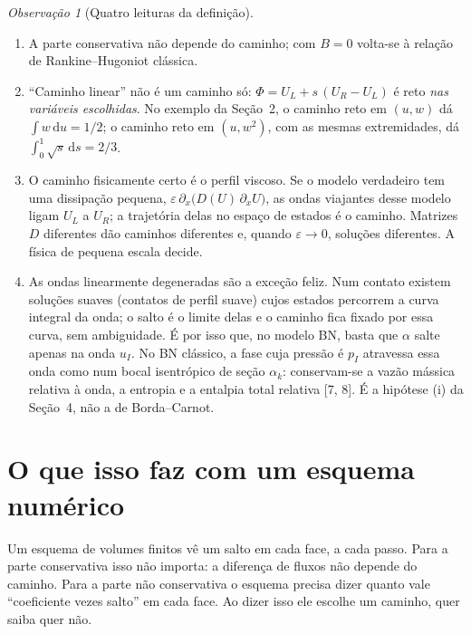 \documentclass[11pt,a4paper]{article}
\theoremstyle{definition}
\theoremstyle{remark}
\newtheorem{observacao}[definicao]{Observação}
\newcommand{\dd}{\mathrm{d}}
\begin{document}
\begin{observacao}[Quatro leituras da definição]\label{obs:leituras}\leavevmode
\begin{enumerate}
\item A parte conservativa não depende do caminho; com $B=0$ volta-se à relação de Rankine--Hugoniot clássica.
\item ``Caminho linear'' não é um caminho só: $\Phi=U_L+s\,(U_R-U_L)$ é reto \emph{nas variáveis escolhidas}. No exemplo da Seção~2, o caminho reto em $(u,w)$ dá $\int w\,\dd u=1/2$; o caminho reto em $(u,w^2)$, com as mesmas extremidades, dá $\int_0^1\sqrt s\,\dd s=2/3$.
\item O caminho fisicamente certo é o perfil viscoso. Se o modelo verdadeiro tem uma dissipação pequena, $\varepsilon\,\partial_x\big(D(U)\,\partial_xU\big)$, as ondas viajantes desse modelo ligam $U_L$ a $U_R$; a trajetória delas no espaço de estados é o caminho. Matrizes $D$ diferentes dão caminhos diferentes e, quando $\varepsilon\to0$, soluções diferentes. A física de pequena escala decide.
\item As ondas linearmente degeneradas são a exceção feliz. Num contato existem soluções suaves (contatos de perfil suave) cujos estados percorrem a curva integral da onda; o salto é o limite delas e o caminho fica fixado por essa curva, sem ambiguidade. É por isso que, no modelo BN, basta que $\alpha$ salte apenas na onda $u_I$. No BN clássico, a fase cuja pressão é $p_I$ atravessa essa onda como num bocal isentrópico de seção $\alpha_k$: conservam-se a vazão mássica relativa à onda, a entropia e a entalpia total relativa [7, 8]. É a hipótese (i) da Seção~4, não a de Borda--Carnot.
\end{enumerate}
\end{observacao}

\section{O que isso faz com um esquema numérico}

\begin{intuicao}
Um esquema de volumes finitos vê um salto em cada face, a cada passo. Para a parte conservativa isso não importa: a diferença de fluxos não depende do caminho. Para a parte não conservativa o esquema precisa dizer quanto vale ``coeficiente vezes salto'' em cada face. Ao dizer isso ele escolhe um caminho, quer saiba quer não.
\end{intuicao}
\end{document}
